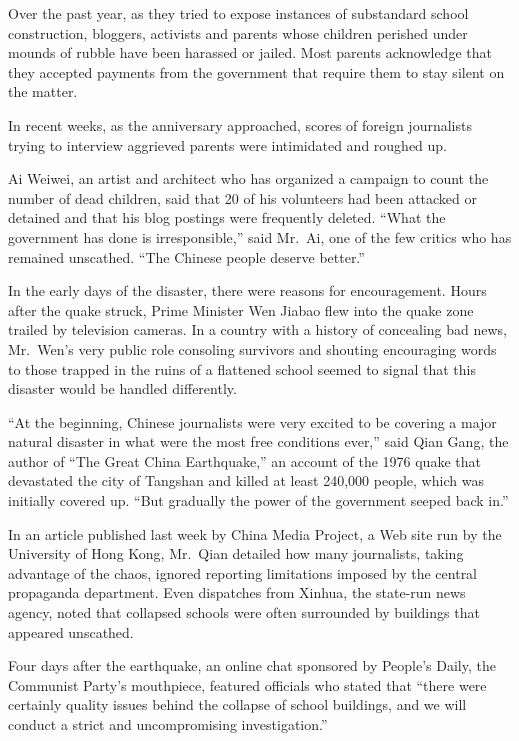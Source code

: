 \documentclass[12pt,a4paper,onecolumn]{article}
\begin{document}
Over the past year, as they tried to expose instances of substandard school construction, bloggers,
activists and parents whose children perished under mounds of rubble have been harassed or jailed.
Most parents acknowledge that they accepted payments from the government that require them to stay
silent on the matter.

In recent weeks, as the anniversary approached, scores of foreign journalists trying to interview
aggrieved parents were intimidated and roughed up.

Ai Weiwei, an artist and architect who has organized a campaign to count the number of dead
children, said that 20 of his volunteers had been attacked or detained and that his blog postings
were frequently deleted. ``What the government has done is irresponsible,'' said Mr.~Ai, one of the
few critics who has remained unscathed. ``The Chinese people deserve better.''

In the early days of the disaster, there were reasons for encouragement. Hours after the quake
struck, Prime Minister Wen Jiabao flew into the quake zone trailed by television cameras. In a
country with a history of concealing bad news, Mr.~Wen's very public role consoling survivors and
shouting encouraging words to those trapped in the ruins of a flattened school seemed to signal that
this disaster would be handled differently.

``At the beginning, Chinese journalists were very excited to be covering a major natural disaster in
what were the most free conditions ever,'' said Qian Gang, the author of ``The Great China
Earthquake,'' an account of the 1976 quake that devastated the city of Tangshan and killed at least
240,000 people, which was initially covered up. ``But gradually the power of the government seeped
back in.''

In an article published last week by China Media Project, a Web site run by the University of Hong
Kong, Mr.~Qian detailed how many journalists, taking advantage of the chaos, ignored reporting
limitations imposed by the central propaganda department. Even dispatches from Xinhua, the state-run
news agency, noted that collapsed schools were often surrounded by buildings that appeared
unscathed.

Four days after the earthquake, an online chat sponsored by People's Daily, the Communist Party's
mouthpiece, featured officials who stated that ``there were certainly quality issues behind the
collapse of school buildings, and we will conduct a strict and uncompromising investigation.''
\end{document}

